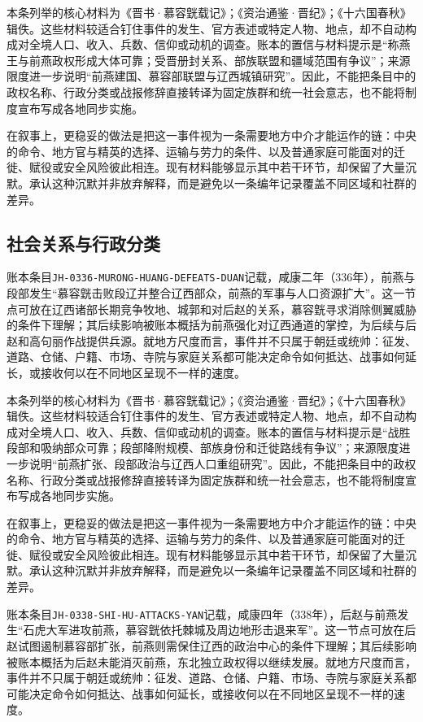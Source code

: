 本条列举的核心材料为《晋书·慕容皝载记》；《资治通鉴·晋纪》；《十六国春秋》辑佚。这些材料较适合钉住事件的发生、官方表述或特定人物、地点，却不自动构成对全境人口、收入、兵数、信仰或动机的调查。账本的置信与材料提示是“称燕王与前燕政权形成大体可靠；受晋册封关系、部族联盟和疆域范围有争议”；来源限度进一步说明“前燕建国、慕容部联盟与辽西城镇研究”。因此，不能把条目中的政权名称、行政分类或战报修辞直接转译为固定族群和统一社会意志，也不能将制度宣布写成各地同步实施。

在叙事上，更稳妥的做法是把这一事件视为一条需要地方中介才能运作的链：中央的命令、地方官与精英的选择、运输与劳力的条件、以及普通家庭可能面对的迁徙、赋役或安全风险彼此相连。现有材料能够显示其中若干环节，却保留了大量沉默。承认这种沉默并非放弃解释，而是避免以一条编年记录覆盖不同区域和社群的差异。

\subsection{社会关系与行政分类}

账本条目\texttt{JH-0336-MURONG-HUANG-DEFEATS-DUAN}记载，咸康二年（336年），前燕与段部发生“慕容皝击败段辽并整合辽西部众，前燕的军事与人口资源扩大”。这一节点可放在辽西诸部长期竞争牧地、城郭和对后赵的关系，慕容皝寻求消除侧翼威胁的条件下理解；其后续影响被账本概括为前燕强化对辽西通道的掌控，为后续与后赵和高句丽作战提供兵源。就地方尺度而言，事件并不只属于朝廷或统帅：征发、道路、仓储、户籍、市场、寺院与家庭关系都可能决定命令如何抵达、战事如何延长，或接收何以在不同地区呈现不一样的速度。

本条列举的核心材料为《晋书·慕容皝载记》；《资治通鉴·晋纪》；《十六国春秋》辑佚。这些材料较适合钉住事件的发生、官方表述或特定人物、地点，却不自动构成对全境人口、收入、兵数、信仰或动机的调查。账本的置信与材料提示是“战胜段部和吸纳部众可靠；段部降附规模、部族身份和迁徙路线有争议”；来源限度进一步说明“前燕扩张、段部政治与辽西人口重组研究”。因此，不能把条目中的政权名称、行政分类或战报修辞直接转译为固定族群和统一社会意志，也不能将制度宣布写成各地同步实施。

在叙事上，更稳妥的做法是把这一事件视为一条需要地方中介才能运作的链：中央的命令、地方官与精英的选择、运输与劳力的条件、以及普通家庭可能面对的迁徙、赋役或安全风险彼此相连。现有材料能够显示其中若干环节，却保留了大量沉默。承认这种沉默并非放弃解释，而是避免以一条编年记录覆盖不同区域和社群的差异。

账本条目\texttt{JH-0338-SHI-HU-ATTACKS-YAN}记载，咸康四年（338年），后赵与前燕发生“石虎大军进攻前燕，慕容皝依托棘城及周边地形击退来军”。这一节点可放在后赵试图遏制慕容部扩张，前燕则需保住辽西的政治中心的条件下理解；其后续影响被账本概括为后赵未能消灭前燕，东北独立政权得以继续发展。就地方尺度而言，事件并不只属于朝廷或统帅：征发、道路、仓储、户籍、市场、寺院与家庭关系都可能决定命令如何抵达、战事如何延长，或接收何以在不同地区呈现不一样的速度。

